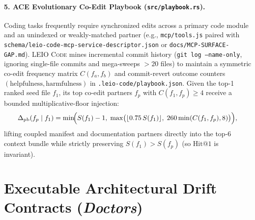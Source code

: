 \documentclass[11pt]{article}
\begin{document}
\paragraph{5. ACE Evolutionary Co-Edit Playbook (\texttt{src/playbook.rs}).}
Coding tasks frequently require synchronized edits across a primary code module and an unindexed or weakly-matched partner (e.g., \texttt{mcp/tools.js} paired with \texttt{schema/leio-code-mcp-service-descriptor.json} or \texttt{docs/MCP-SURFACE-GAP.md}). \textsc{LEIO Code} mines incremental commit history (\texttt{git log --name-only}, ignoring single-file commits and mega-sweeps $>20$ files) to maintain a symmetric co-edit frequency matrix $C(f_a, f_b)$ and commit-revert outcome counters $(\text{helpfulness}, \text{harmfulness})$ in \texttt{.leio-code/playbook.json}. Given the top-1 ranked seed file $f_1$, its top co-edit partners $f_p$ with $C(f_1, f_p) \ge 4$ receive a bounded multiplicative-floor injection:
\begin{equation}
\Delta_{\text{pb}}(f_p \mid f_1) = \min\!\Bigl(S(f_1) - 1,\; \max\bigl(\lfloor 0.75\, S(f_1) \rfloor,\; 260 \min(C(f_1, f_p), 8)\bigr)\Bigr),
\end{equation}
lifting coupled manifest and documentation partners directly into the top-$6$ context bundle while strictly preserving $S(f_1) > S(f_p)$ (so $\text{Hit@1}$ is invariant).

\section{Executable Architectural Drift Contracts (\emph{Doctors})}
\label{sec:doctors}
\end{document}

